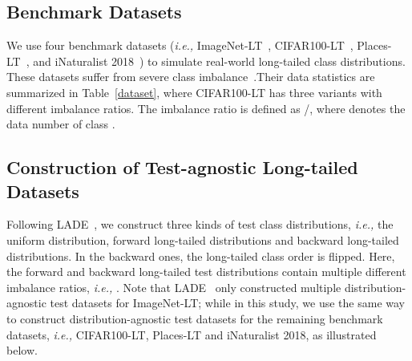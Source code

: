 \documentclass{article}
\def\ie{\emph{i.e.}} \def\Ie{\emph{I.e.}}
\def\ie{\emph{i.e., }}
\begin{document}
\subsection{Benchmark Datasets} \label{App_C1}
We use four benchmark  datasets (\ie ImageNet-LT~\cite{liu2019large}, CIFAR100-LT~\cite{cao2019learning}, Places-LT~\cite{liu2019large}, and iNaturalist 2018~\cite{van2018inaturalist}) to simulate real-world long-tailed class distributions. These datasets suffer from severe class imbalance~\cite{johnson2019survey,zhang2018online}.Their data  statistics are summarized   in Table~\ref{dataset}, where CIFAR100-LT has three variants with different imbalance ratios. The imbalance ratio is defined as /, where  denotes the data number of class . 
\begin{table}[h]   
     \caption{Statistics of datasets.}\label{dataset}   \vspace{-0.1in}
    \begin{center} 
    \end{center}   \vspace{-0.1in} 
\end{table}
 
\subsection{Construction of Test-agnostic Long-tailed Datasets} \label{App_C2}
Following LADE~\cite{hong2020disentangling},  we construct three kinds of test class distributions, \ie the uniform  distribution, forward long-tailed distributions and backward long-tailed distributions. In the backward ones, the long-tailed class order is flipped.  Here, the forward and backward  long-tailed test distributions contain multiple different imbalance ratios, \ie . Note that LADE~\cite{hong2020disentangling} only constructed multiple  distribution-agnostic test datasets  for ImageNet-LT; while in this study, we use the same way to construct distribution-agnostic test datasets  for the remaining benchmark datasets, \ie CIFAR100-LT, Places-LT and iNaturalist 2018, as illustrated below.
\end{document}
